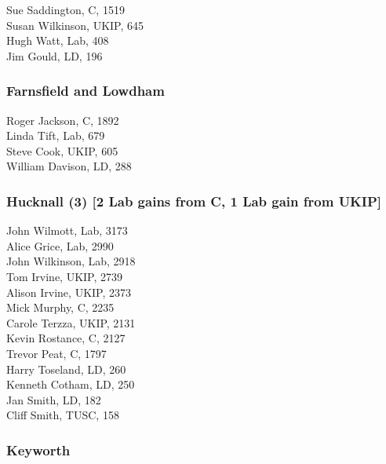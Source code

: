 \documentclass[a4paper,openany,10pt]{book}
\begin{document}


Sue Saddington, C, 1519\\
Susan Wilkinson, UKIP, 645\\
Hugh Watt, Lab, 408\\
Jim Gould, LD, 196\\


\subsubsection*{Farnsfield and Lowdham}



Roger Jackson, C, 1892\\
Linda Tift, Lab, 679\\
Steve Cook, UKIP, 605\\
William Davison, LD, 288\\


\subsubsection*{Hucknall (3) \hspace*{\fill}\nolinebreak[1]%
\enspace\hspace*{\fill}
[2 Lab gains from C, 1 Lab gain from UKIP]}



John Wilmott, Lab, 3173\\
Alice Grice, Lab, 2990\\
John Wilkinson, Lab, 2918\\
Tom Irvine, UKIP, 2739\\
Alison Irvine, UKIP, 2373\\
Mick Murphy, C, 2235\\
Carole Terzza, UKIP, 2131\\
Kevin Rostance, C, 2127\\
Trevor Peat, C, 1797\\
Harry Toseland, LD, 260\\
Kenneth Cotham, LD, 250\\
Jan Smith, LD, 182\\
Cliff Smith, TUSC, 158\\


\subsubsection*{Keyworth}
\end{document}
